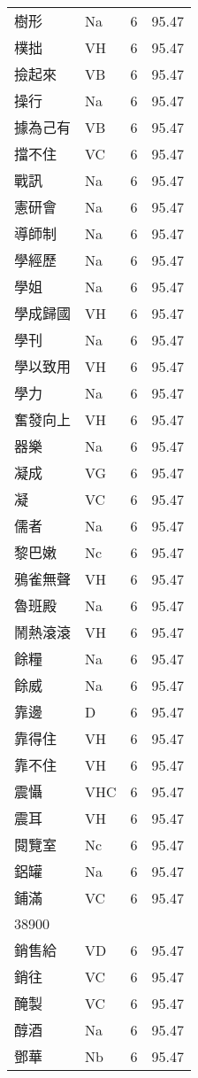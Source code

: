 \documentclass[twocolumn]{book}
\begin{document}
\begin{supertabular}{llrr}
樹形 & Na & 6 &  95.47\\
樸拙 & VH & 6 &  95.47\\
撿起來 & VB & 6 &  95.47\\
操行 & Na & 6 &  95.47\\
據為己有 & VB & 6 &  95.47\\
擋不住 & VC & 6 &  95.47\\
戰訊 & Na & 6 &  95.47\\
憲研會 & Na & 6 &  95.47\\
導師制 & Na & 6 &  95.47\\
學經歷 & Na & 6 &  95.47\\
學姐 & Na & 6 &  95.47\\
學成歸國 & VH & 6 &  95.47\\
學刊 & Na & 6 &  95.47\\
學以致用 & VH & 6 &  95.47\\
學力 & Na & 6 &  95.47\\
奮發向上 & VH & 6 &  95.47\\
器樂 & Na & 6 &  95.47\\
凝成 & VG & 6 &  95.47\\
凝 & VC & 6 &  95.47\\
儒者 & Na & 6 &  95.47\\
黎巴嫩 & Nc & 6 &  95.47\\
鴉雀無聲 & VH & 6 &  95.47\\
魯班殿 & Na & 6 &  95.47\\
鬧熱滾滾 & VH & 6 &  95.47\\
餘糧 & Na & 6 &  95.47\\
餘威 & Na & 6 &  95.47\\
靠邊 & D & 6 &  95.47\\
靠得住 & VH & 6 &  95.47\\
靠不住 & VH & 6 &  95.47\\
震懾 & VHC & 6 &  95.47\\
震耳 & VH & 6 &  95.47\\
閱覽室 & Nc & 6 &  95.47\\
鋁罐 & Na & 6 &  95.47\\
鋪滿 & VC & 6 &  95.47\\
38900\\
銷售給 & VD & 6 &  95.47\\
銷往 & VC & 6 &  95.47\\
醃製 & VC & 6 &  95.47\\
醇酒 & Na & 6 &  95.47\\
鄧華 & Nb & 6 &  95.47\\

\end{supertabular}
\end{document}

